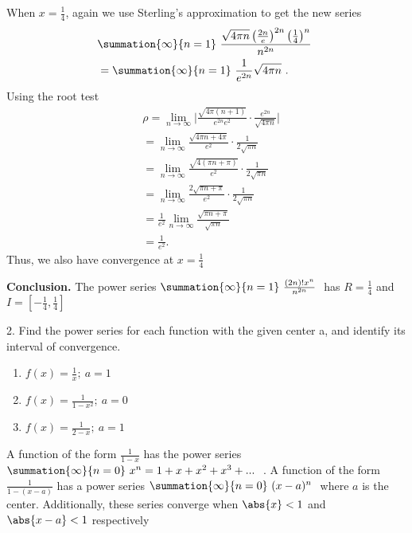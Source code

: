 \documentclass{report}
\begin{document}
    \hspace{1in}
    \begin{minipage}[t]{0.4\textwidth}
        When $x=\frac{1}{4}$, again we use Sterling's approximation to get the new series
        \begin{align*}
            &\summation{\infty}{n=1}\ \frac{\sqrt{4\pi n}\left(\frac{2n}{e}\right)^{2n}\left(\frac{1}{4}\right)^{n}}{n^{2n}}\  \\
            &=\summation{\infty}{n=1}\ \frac{1}{e^{2n}}\sqrt{4\pi n}\ 
        .\end{align*}
        Using the root test
        \begin{align*}
            &\rho = \lim\limits_{n \to \infty}{\bigg\lvert \frac{\sqrt{4\pi(n+1)}}{e^{2n}e^{2}} \cdot \frac{e^{2n}}{\sqrt{4\pi n}} \bigg\rvert} \\
            &=\lim\limits_{n \to \infty}{ \frac{\sqrt{4\pi n + 4\pi}}{e^{2}} \cdot \frac{1}{2\sqrt{\pi n}} } \\
            &=\lim\limits_{n \to \infty}{ \frac{\sqrt{4(\pi n + \pi)}}{e^{2}} \cdot \frac{1}{2\sqrt{\pi n}} } \\
            &=\lim\limits_{n \to \infty}{ \frac{2\sqrt{\pi n + \pi}}{e^{2}} \cdot \frac{1}{2\sqrt{\pi n}} } \\
            &=\frac{1}{e^{2}}\lim\limits_{n \to \infty}{ \frac{\sqrt{\pi n + \pi}}{\sqrt{\pi n}}} \\ 
            &=\frac{1}{e^{2}}
        .\end{align*}
        \bigbreak \noindent 
        Thus, we also have convergence at $x=\frac{1}{4}$
    \end{minipage}
    \bigbreak \noindent 
    \textbf{Conclusion.} The power series $\summation{\infty}{n=1}\ \frac{(2n)!x^{n}}{n^{2n}}\ $ has $R = \frac{1}{4} $ and $I=[-\frac{1}{4}, \frac{1}{4}] $

    \pagebreak \bigbreak \noindent 
    \begin{mdframed}
        2. Find the power series for each function with the given center a, and identify its interval of convergence.
        \begin{enumerate}[label=(\alph*)]
            \item $f(x) = \frac{1}{x};\ a=1 $ 
            \item $f(x) = \frac{1}{1-x^{2}};\ a=0 $
            \item $f(x) = \frac{1}{2-x};\ a=1 $
        \end{enumerate}
    \end{mdframed}
    \bigbreak \noindent 
    \begin{remark}
        A function of the form $\frac{1}{1-x}$ has the power series $\summation{\infty}{n=0}\ x^{n} = 1 + x + x^{2} + x^{3} + ...  \  $ . A function of the form $\frac{1}{1-(x-a)} $ has a power series $\summation{\infty}{n=0}\ (x-a)^{n}\  $ where $a$ is the center. Additionally, these series converge when $\abs{x} < 1 $ and $\abs{x-a} < 1  $ respectively
    \end{remark}
    
\end{document}
